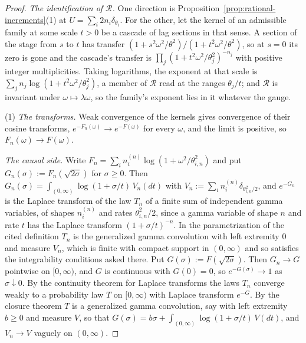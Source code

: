 \begin{proof}
\emph{The identification of $\mathcal{R}$.} One direction is
Proposition~\ref{prop:rational-increments}(1) at $U = \sum_i 2n_i\delta_{\theta_i}$. For the other,
let the kernel of an admissible family at some scale $t > 0$ be a cascade of lag sections in that
sense. A section of the stage from $s$ to $t$ has transfer
$(1 + s^2\omega^2/\theta^2)/(1 + t^2\omega^2/\theta^2)$, so at $s = 0$ its zero is gone and the
cascade's transfer is $\prod_j(1 + t^2\omega^2/\theta_j^2)^{-n_j}$ with positive integer
multiplicities. Taking logarithms, the exponent at that scale is
$\sum_j n_j\log(1 + t^2\omega^2/\theta_j^2)$, a member of $\mathcal{R}$ read at the ranges
$\theta_j/t$; and $\mathcal{R}$ is invariant under $\omega \mapsto \lambda\omega$, so the family's
exponent lies in it whatever the gauge.

(1) \emph{The transforms.} Weak convergence of the kernels gives convergence of their cosine
transforms, $e^{-F_n(\omega)} \to e^{-F(\omega)}$ for every $\omega$, and the limit is positive,
so $F_n(\omega) \to F(\omega)$.

\emph{The causal side.} Write $F_n = \sum_i n_i^{(n)}\log(1 + \omega^2/\theta_{i,n}^2)$ and put
$G_n(\sigma) := F_n(\sqrt{2\sigma})$ for $\sigma \ge 0$. Then
$G_n(\sigma) = \int_{(0,\infty)}\log(1 + \sigma/t)\,V_n(dt)$ with
$V_n := \sum_i n_i^{(n)}\delta_{\theta_{i,n}^2/2}$, and $e^{-G_n}$ is the Laplace transform of the
law $T_n$ of a finite sum of independent gamma variables, of shapes $n_i^{(n)}$ and rates
$\theta_{i,n}^2/2$, since a gamma variable of shape $n$ and rate $t$ has the Laplace transform
$(1 + \sigma/t)^{-n}$. In the parametrization of the cited definition $T_n$ is the generalized
gamma convolution with left extremity $0$ and measure $V_n$, which is finite with compact support
in $(0,\infty)$ and so satisfies the integrability conditions asked there. Put
$G(\sigma) := F(\sqrt{2\sigma})$. Then $G_n \to G$ pointwise on $[0,\infty)$, and $G$ is
continuous with $G(0) = 0$, so $e^{-G(\sigma)} \to 1$ as $\sigma \downarrow 0$. By the
continuity theorem for Laplace transforms the laws $T_n$ converge weakly to a probability law
$T$ on $[0,\infty)$ with Laplace transform $e^{-G}$. By the closure theorem $T$ is a generalized
gamma convolution, say with left extremity $b \ge 0$ and measure $V$, so that
$G(\sigma) = b\sigma + \int_{(0,\infty)}\log(1 + \sigma/t)\,V(dt)$, and $V_n \to V$ vaguely on
$(0,\infty)$.


\end{proof}
